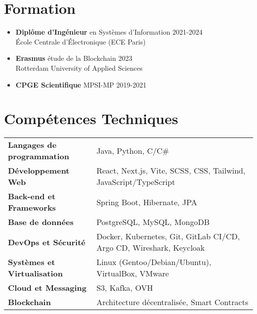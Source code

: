 \documentclass[11pt, a4paper]{article}
\begin{document}
\section*{Formation}
\begin{itemize}
    \item \textbf{Diplôme d'Ingénieur} en Systèmes d'Information \hfill 2021-2024\\
          École Centrale d'Électronique (ECE Paris)

    \item \textbf{Erasmus} étude de la Blockchain \hfill 2023\\
          Rotterdam University of Applied Sciences

    \item \textbf{CPGE Scientifique} MPSI-MP \hfill 2019-2021
\end{itemize}

\section*{Compétences Techniques}
\renewcommand{\arraystretch}{1.3} %
\begin{tabular}{@{}p{5.5cm}p{10cm}@{}}
    \textbf{Langages de programmation} & Java, Python, C/C\# \vspace{0.4em} \\
    \textbf{Développement Web} & React, Next.js, Vite, SCSS, CSS, Tailwind, JavaScript/TypeScript \vspace{0.4em} \\
    \textbf{Back-end et Frameworks} & Spring Boot, Hibernate, JPA \vspace{0.4em} \\
    \textbf{Base de données} & PostgreSQL, MySQL, MongoDB \vspace{0.4em} \\
    \textbf{DevOps et Sécurité} & Docker, Kubernetes, Git, GitLab CI/CD, Argo CD, Wireshark, Keycloak \vspace{0.4em} \\
    \textbf{Systèmes et Virtualisation} & Linux (Gentoo/Debian/Ubuntu), VirtualBox, VMware \vspace{0.4em} \\
    \textbf{Cloud et Messaging} & S3, Kafka, OVH \vspace{0.4em} \\
    \textbf{Blockchain} & Architecture décentralisée, Smart Contracts \\
\end{tabular}
\end{document}
